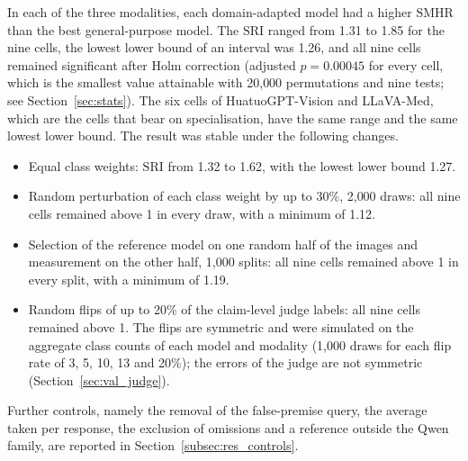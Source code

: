 \documentclass[11pt,a4paper]{article}
\newcommand{\SMHR}{\ensuremath{\mathrm{SMHR}}}
\newcommand{\SRI}{\ensuremath{\mathrm{SRI}}}
\begin{document}
In each of the three modalities, each domain-adapted model had a higher \SMHR{} than the best general-purpose model. The \SRI{} ranged from 1.31 to 1.85 for the nine cells, the lowest lower bound of an interval was 1.26, and all nine cells remained significant after Holm correction (adjusted $p = 0.00045$ for every cell, which is the smallest value attainable with 20{,}000 permutations and nine tests; see Section~\ref{sec:stats}). The six cells of HuatuoGPT-Vision and LLaVA-Med, which are the cells that bear on specialisation, have the same range and the same lowest lower bound. The result was stable under the following changes.
\begin{itemize}
  \item Equal class weights: \SRI{} from 1.32 to 1.62, with the lowest lower bound 1.27.
  \item Random perturbation of each class weight by up to 30\%, 2{,}000 draws: all nine cells remained above 1 in every draw, with a minimum of 1.12.
  \item Selection of the reference model on one random half of the images and measurement on the other half, 1{,}000 splits: all nine cells remained above 1 in every split, with a minimum of 1.19.
  \item Random flips of up to 20\% of the claim-level judge labels: all nine cells remained above 1. The flips are symmetric and were simulated on the aggregate class counts of each model and modality (1{,}000 draws for each flip rate of 3, 5, 10, 13 and 20\%); the errors of the judge are not symmetric (Section~\ref{sec:val_judge}).
\end{itemize}
Further controls, namely the removal of the false-premise query, the average taken per response, the exclusion of omissions and a reference outside the Qwen family, are reported in Section~\ref{subsec:res_controls}.
\end{document}
